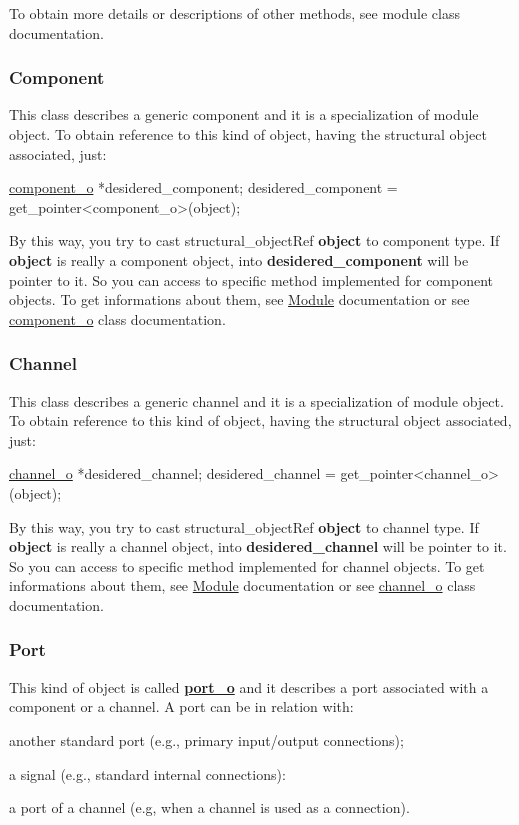 To obtain more details or descriptions of other methods, see module class documentation.\hypertarget{src_circuit_page_s_o_component}{}\subsubsection{Component}\label{src_circuit_page_s_o_component}
This class describes a generic component and it is a specialization of module object. To obtain reference to this kind of object, having the structural object associated, just\+: 
\begin{DoxyCode}
\hyperlink{classcomponent__o}{component\_o} *desidered\_component;
desidered\_component = get\_pointer<component\_o>(object);
\end{DoxyCode}
 By this way, you try to cast structural\+\_\+object\+Ref {\bfseries object} to component type. If {\bfseries object} is really a component object, into {\bfseries desidered\+\_\+component} will be pointer to it. So you can access to specific method implemented for component objects. To get informations about them, see \hyperlink{src_circuit_page_s_o_module}{Module} documentation or see \hyperlink{classcomponent__o}{component\+\_\+o} class documentation.\hypertarget{src_circuit_page_s_o_channel}{}\subsubsection{Channel}\label{src_circuit_page_s_o_channel}
This class describes a generic channel and it is a specialization of module object. To obtain reference to this kind of object, having the structural object associated, just\+: 
\begin{DoxyCode}
\hyperlink{classchannel__o}{channel\_o} *desidered\_channel;
desidered\_channel = get\_pointer<channel\_o>(object);
\end{DoxyCode}
 By this way, you try to cast structural\+\_\+object\+Ref {\bfseries object} to channel type. If {\bfseries object} is really a channel object, into {\bfseries desidered\+\_\+channel} will be pointer to it. So you can access to specific method implemented for channel objects. To get informations about them, see \hyperlink{src_circuit_page_s_o_module}{Module} documentation or see \hyperlink{classchannel__o}{channel\+\_\+o} class documentation.\hypertarget{src_circuit_page_s_o_port}{}\subsubsection{Port}\label{src_circuit_page_s_o_port}
This kind of object is called {\bfseries \hyperlink{structport__o}{port\+\_\+o}} and it describes a port associated with a component or a channel. A port can be in relation with\+:
\begin{DoxyItemize}
\item another standard port (e.\+g., primary input/output connections);
\item a signal (e.\+g., standard internal connections)\+:
\item a port of a channel (e.\+g, when a channel is used as a connection).
\end{DoxyItemize}

